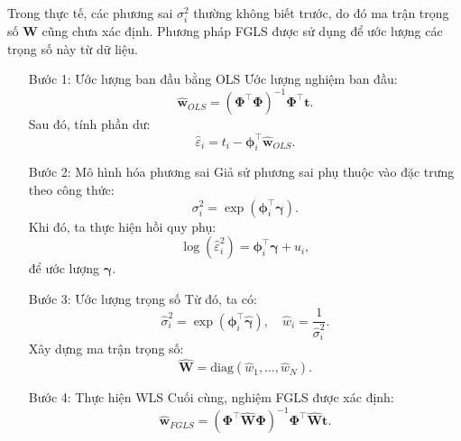 Trong thực tế, các phương sai $\sigma_i^2$ thường không biết trước, do đó ma
trận trọng số $\boldsymbol{W}$ cũng chưa xác định. Phương pháp FGLS được sử
dụng để ước lượng các trọng số này từ dữ liệu.
\begin{itemize}[align=left,font=\bfseries]

  \item[Bước 1: Ước lượng ban đầu bằng OLS]
    Ước lượng nghiệm ban đầu: \begin{equation}
      \hat{\boldsymbol{w}}_{OLS} =
      (\boldsymbol{\Phi}^\intercal \boldsymbol{\Phi})^{-1}
      \boldsymbol{\Phi}^\intercal \boldsymbol{t}.
    \end{equation} Sau đó, tính phần dư: \begin{equation}
      \hat{\varepsilon}_i = t_i - \boldsymbol{\phi}_i^\intercal
      \hat{\boldsymbol{w}}_{OLS}.
    \end{equation}

  \item[Bước 2: Mô hình hóa phương sai]
    Giả sử phương sai phụ thuộc vào đặc trưng theo công thức: \begin{equation}
      \sigma_i^2 = \exp(\boldsymbol{\phi}_i^\intercal \boldsymbol{\gamma}).
    \end{equation} Khi đó, ta thực hiện hồi quy phụ: \begin{equation}
      \log(\hat{\varepsilon}_i^2) = \boldsymbol{\phi}_i^\intercal
      \boldsymbol{\gamma} + u_i,
    \end{equation} để ước lượng $\boldsymbol{\gamma}$.

  \item[Bước 3: Ước lượng trọng số]
    Từ đó, ta có: \begin{equation}
      \hat{\sigma}_i^2 = \exp(\boldsymbol{\phi}_i^\intercal
      \hat{\boldsymbol{\gamma}}),  \quad \hat{w}_i = \frac{1}{\hat{\sigma}_i^2}.
    \end{equation} Xây dựng ma trận trọng số: \begin{equation}
      \hat{\boldsymbol{W}} = \mathrm{diag}(\hat{w}_1, \dots, \hat{w}_N).
    \end{equation}

  \item[Bước 4: Thực hiện WLS]
    Cuối cùng, nghiệm FGLS được xác định: \begin{equation}
      \hat{\boldsymbol{w}}_{FGLS} =
      (\boldsymbol{\Phi}^\intercal \hat{\boldsymbol{W}} \boldsymbol{\Phi})^{-1}
      \boldsymbol{\Phi}^\intercal \hat{\boldsymbol{W}} \boldsymbol{t}.
    \end{equation}
\end{itemize}

